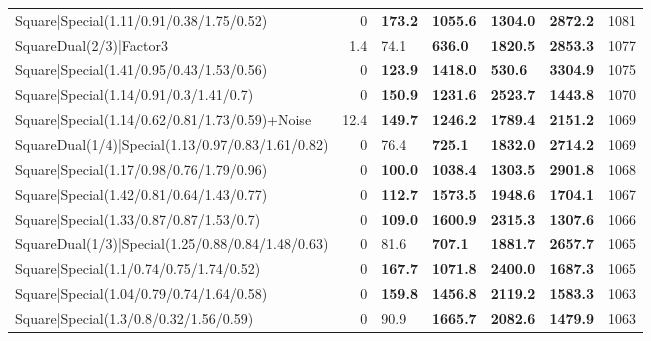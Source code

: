 \begin{tabular}{lrllllr}
 Square|Special(1.11/0.91/0.38/1.75/0.52)                      &             0   & \textbf{173.2} & \textbf{1055.6} & \textbf{1304.0} & \textbf{2872.2} &         1081 \\
 SquareDual(2/3)|Factor3                                       &             1.4 & 74.1           & \textbf{636.0}  & \textbf{1820.5} & \textbf{2853.3} &         1077 \\
 Square|Special(1.41/0.95/0.43/1.53/0.56)                      &             0   & \textbf{123.9} & \textbf{1418.0} & \textbf{530.6}  & \textbf{3304.9} &         1075 \\
 Square|Special(1.14/0.91/0.3/1.41/0.7)                        &             0   & \textbf{150.9} & \textbf{1231.6} & \textbf{2523.7} & \textbf{1443.8} &         1070 \\
 Square|Special(1.14/0.62/0.81/1.73/0.59)+Noise                &            12.4 & \textbf{149.7} & \textbf{1246.2} & \textbf{1789.4} & \textbf{2151.2} &         1069 \\
 SquareDual(1/4)|Special(1.13/0.97/0.83/1.61/0.82)             &             0   & 76.4           & \textbf{725.1}  & \textbf{1832.0} & \textbf{2714.2} &         1069 \\
 Square|Special(1.17/0.98/0.76/1.79/0.96)                      &             0   & \textbf{100.0} & \textbf{1038.4} & \textbf{1303.5} & \textbf{2901.8} &         1068 \\
 Square|Special(1.42/0.81/0.64/1.43/0.77)                      &             0   & \textbf{112.7} & \textbf{1573.5} & \textbf{1948.6} & \textbf{1704.1} &         1067 \\
 Square|Special(1.33/0.87/0.87/1.53/0.7)                       &             0   & \textbf{109.0} & \textbf{1600.9} & \textbf{2315.3} & \textbf{1307.6} &         1066 \\
 SquareDual(1/3)|Special(1.25/0.88/0.84/1.48/0.63)             &             0   & 81.6           & \textbf{707.1}  & \textbf{1881.7} & \textbf{2657.7} &         1065 \\
 Square|Special(1.1/0.74/0.75/1.74/0.52)                       &             0   & \textbf{167.7} & \textbf{1071.8} & \textbf{2400.0} & \textbf{1687.3} &         1065 \\
 Square|Special(1.04/0.79/0.74/1.64/0.58)                      &             0   & \textbf{159.8} & \textbf{1456.8} & \textbf{2119.2} & \textbf{1583.3} &         1063 \\
 Square|Special(1.3/0.8/0.32/1.56/0.59)                        &             0   & 90.9           & \textbf{1665.7} & \textbf{2082.6} & \textbf{1479.9} &         1063 \\

\end{tabular}
